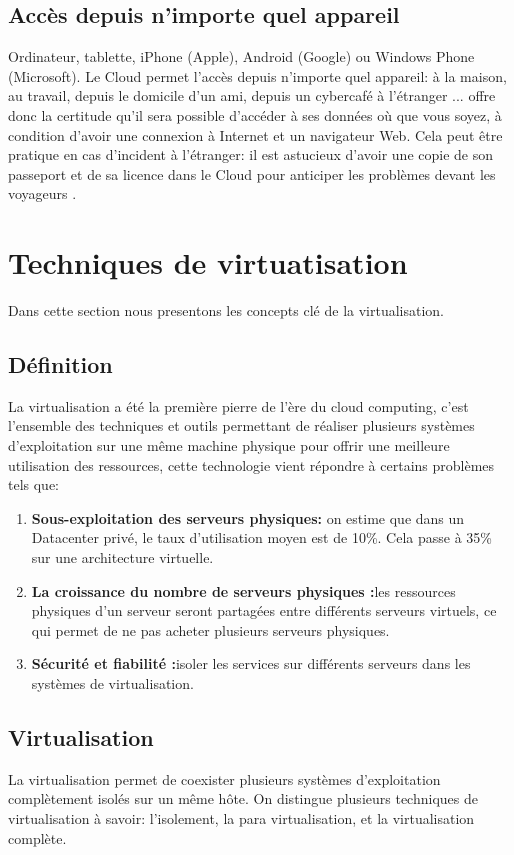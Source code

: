 \subsection{Accès depuis n'importe quel appareil}
Ordinateur, tablette, iPhone (Apple), Android (Google) ou Windows Phone (Microsoft). Le Cloud permet l'accès depuis n'importe quel appareil: à la maison, au travail, depuis le domicile d'un ami, depuis un cybercafé à l'étranger ... offre donc la certitude qu'il sera possible d'accéder à ses données où que vous soyez, à condition d'avoir une connexion à Internet et un navigateur Web. Cela peut être pratique en cas d'incident à l'étranger: il est astucieux d'avoir une copie de son passeport et de sa licence dans le Cloud pour anticiper les problèmes devant les voyageurs \cite{c3}.
\section{Techniques de virtuatisation}
Dans cette section nous presentons les concepts clé de la virtualisation.
\subsection{Définition}
La virtualisation a été la première pierre de l'ère du cloud computing, c'est l'ensemble des techniques et outils permettant de réaliser plusieurs systèmes d'exploitation sur une même machine physique pour offrir une meilleure utilisation des ressources, cette technologie vient répondre à certains problèmes tels que:
\begin{enumerate}
    \item \textbf{Sous-exploitation des serveurs physiques:} on estime que dans un Datacenter privé, le taux d'utilisation moyen est de 10\%. Cela passe à 35\% sur une architecture virtuelle.
\item \textbf{La croissance du nombre de serveurs physiques :}les ressources physiques d'un serveur seront partagées entre différents serveurs virtuels, ce qui permet de ne pas acheter plusieurs serveurs physiques. 
\item \textbf{Sécurité et fiabilité :}isoler les services sur différents serveurs dans les systèmes de virtualisation.

\end{enumerate}
\subsection{Virtualisation}
La virtualisation permet de coexister plusieurs systèmes d'exploitation complètement isolés sur un même hôte. On distingue plusieurs techniques de virtualisation à savoir: l'isolement, la para virtualisation, et la virtualisation complète.

